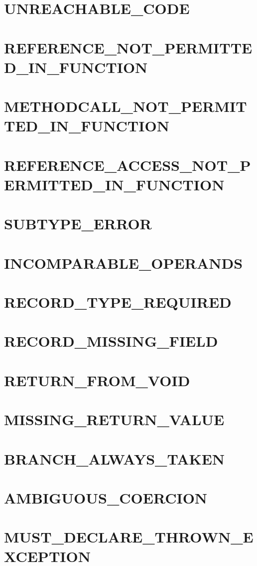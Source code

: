 \section{UNREACHABLE_CODE}
\section{REFERENCE_NOT_PERMITTED_IN_FUNCTION}
\section{METHODCALL_NOT_PERMITTED_IN_FUNCTION}
\section{REFERENCE_ACCESS_NOT_PERMITTED_IN_FUNCTION}
\section{SUBTYPE_ERROR}
\section{INCOMPARABLE_OPERANDS}
\section{RECORD_TYPE_REQUIRED}
\section{RECORD_MISSING_FIELD}
\section{RETURN_FROM_VOID}
\section{MISSING_RETURN_VALUE}
\section{BRANCH_ALWAYS_TAKEN}
\section{AMBIGUOUS_COERCION}
\section{MUST_DECLARE_THROWN_EXCEPTION}
	